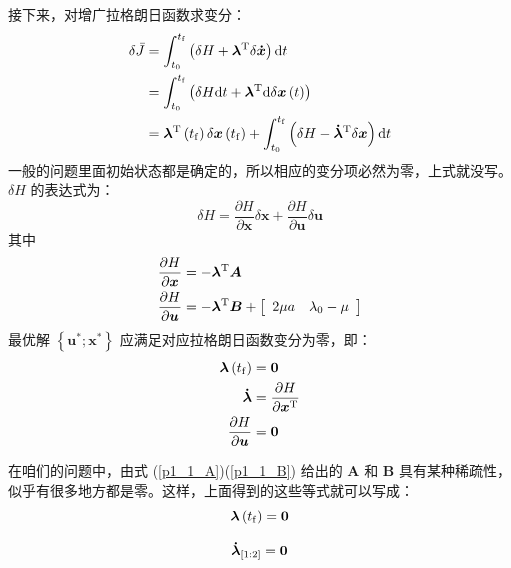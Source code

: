 \documentclass{article}
\numberwithin{equation}{section}
\begin{document}
接下来，对增广拉格朗日函数求变分：
\[\begin{aligned}
\delta \bar J &= \int_{{t_0}}^{{t_{\rm{f}}}} {\left( {\delta H + {{\bm{\lambda }}^{\rm{T}}}\delta {\bm{\dot x}}} \right){\rm{d}}t} \\
 &= \int_{{t_0}}^{{t_{\rm{f}}}} {\left( {\delta H{\rm{d}}t + {{\bm{\lambda }}^{\rm{T}}}{\rm{d}}\delta {\bm{x}}\left( t \right)} \right)} \\
 &= {{\bm{\lambda }}^{\rm{T}}}\left( {{t_{\rm{f}}}} \right)\delta {\bm{x}}\left( {{t_{\rm{f}}}} \right) + \int_{{t_0}}^{{t_{\rm{f}}}} {\left( {\delta H - {{{\bm{\dot \lambda }}}^{\rm{T}}}\delta {\bm{x}}} \right){\rm{d}}t} 
\end{aligned}\]
一般的问题里面初始状态都是确定的，所以相应的变分项必然为零，上式就没写。$\delta H$ 的表达式为：
\[\delta H = \frac{{\partial H}}{{\partial {\bm{x}}}}\delta {\bm{x}} + \frac{{\partial H}}{{\partial {\bm{u}}}}\delta {\bm{u}}\]
其中
\begin{equation}
\label{p1_dH_exprs}
\begin{aligned}
\frac{{\partial H}}{{\partial {\bm{x}}}} &=  - {{\bm{\lambda }}^{\rm{T}}}{\bm{A}}\\
\frac{{\partial H}}{{\partial {\bm{u}}}} &=  - {{\bm{\lambda }}^{\rm{T}}}{\bm{B}} + \left[ {\begin{array}{*{20}{c}}
{2\mu a}&{{\lambda _0} - \mu }
\end{array}} \right]
\end{aligned}
\end{equation}
最优解 $\left\{\bm{u}^*; \bm{x}^*\right\}$ 应满足对应拉格朗日函数变分为零，即：
\begin{equation}
\label{p1_conditions}
\begin{aligned}
{\bm{\lambda }}\left( {{t_{\rm{f}}}} \right) &= {\bf{0}}\\
{\bm{\dot \lambda }} &= \frac{{\partial H}}{{\partial {{\bm{x}}^{\rm{T}}}}}\\
\frac{{\partial H}}{{\partial {\bm{u}}}} &= {\bf{0}}
\end{aligned}
\end{equation}

在咱们的问题中，由式 (\ref{p1_1_A})(\ref{p1_1_B}) 给出的 $\bm{A}$ 和 $\bm{B}$ 具有某种稀疏性，似乎有很多地方都是零。这样，上面得到的这些等式就可以写成：
\begin{equation}
\label{p1_1_lambdaf_eq_0}
{\bm{\lambda }}\left( {{t_{\rm{f}}}} \right) = {\bf{0}}
\end{equation}

\begin{equation}
\label{p1_1_dlambda1_2_eq_0}
{{{\bm{\dot \lambda }}}_{\left[ {1:2} \right]}} = {\bf{0}}
\end{equation}
\end{document}
